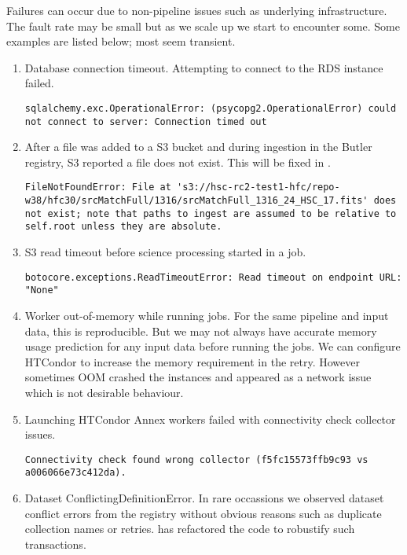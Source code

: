 Failures can occur due to non-pipeline issues such as underlying infrastructure.
The fault rate may be small but as we scale up we start to encounter some.
Some examples are listed below; most seem transient.


\begin{enumerate}
\item Database connection timeout.
Attempting to connect to the RDS instance failed.
\begin{lstlisting}[style=basherror]
sqlalchemy.exc.OperationalError: (psycopg2.OperationalError) could not connect to server: Connection timed out
\end{lstlisting}
\item
After a file was added to a S3 bucket and during ingestion in the Butler registry, S3 reported a file does not exist.
This will be fixed in .
\begin{lstlisting}[style=basherror]
FileNotFoundError: File at 's3://hsc-rc2-test1-hfc/repo-w38/hfc30/srcMatchFull/1316/srcMatchFull_1316_24_HSC_17.fits' does not exist; note that paths to ingest are assumed to be relative to self.root unless they are absolute.
\end{lstlisting}
\item S3 read timeout before science processing started in a job.
\begin{lstlisting}[style=basherror]
botocore.exceptions.ReadTimeoutError: Read timeout on endpoint URL: "None"
\end{lstlisting}
\item Worker out-of-memory while running jobs.
For the same pipeline and input data, this is reproducible.
But we may not always have accurate memory usage prediction for any input data before running the jobs.
We can configure HTCondor to increase the memory requirement in the retry.
However sometimes OOM crashed the instances and appeared as a network issue which is not  desirable behaviour.
\item Launching HTCondor Annex workers failed with connectivity check collector issues.
\begin{lstlisting}[style=basherror]
Connectivity check found wrong collector (f5fc15573ffb9c93 vs a006066e73c412da).
\end{lstlisting}
\item Dataset ConflictingDefinitionError.
In rare occassions we observed dataset conflict errors from the registry without obvious reasons such as duplicate collection names or retries.
 has refactored the code to robustify such transactions.

\end{enumerate}
